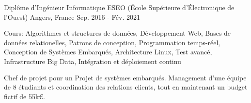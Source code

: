 

\begin{cventries}

  \cventry
    {Diplôme d'Ingénieur Informatique} %
    {ESEO (École Supérieure d'Électronique de l'Ouest)} %
    {Angers, France} %
    {Sep. 2016 - Fév. 2021} %
    {
      \begin{cvitems} %
        \item {Cours: Algorithmes et structures de données, Développement Web, Bases de données relationelles, Patrons de conception, Programmation temps-réel, Conception de Systèmes Embarqués, Architecture Linux, Test avancé, Infrastructure Big Data, Intégration et déploiement continu}
        \item {Chef de projet pour un Projet de systèmes embarqués. Management d'une équipe de 8 étudiants et coordination des relations clients, tout en maintenant un budget fictif de 55k€.}
      \end{cvitems}
    }

\end{cventries}
